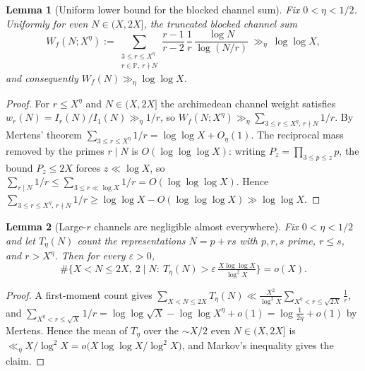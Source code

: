 \documentclass[]{interact}%
\newtheorem{lemma}{Lemma}
\newcommand{\PP}{\mathbb P}
\begin{document}
\begin{lemma}[Uniform lower bound for the blocked channel sum]\label{lem:Wf-size}
Fix $0<\eta<1/2$. Uniformly for even $N\in(X,2X]$, the truncated blocked channel sum
\[
  W_f(N;X^\eta):=\sum_{\substack{3\le r\le X^\eta\\ r\in\PP,\ r\nmid N}}\frac{r-1}{r-2}\,\frac1r\,\frac{\log N}{\log(N/r)}
  \ \gg_\eta\ \log\log X,
\]
and consequently $W_f(N)\gg_\eta\log\log X$.
\end{lemma}
\begin{proof}
For $r\le X^\eta$ and $N\in(X,2X]$ the archimedean channel weight satisfies
$w_r(N)=I_r(N)/I_1(N)\gg_\eta1/r$, so
$W_f(N;X^\eta)\gg_\eta\sum_{3\le r\le X^\eta,\,r\nmid N}1/r$. By Mertens' theorem
$\sum_{3\le r\le X^\eta}1/r=\log\log X+O_\eta(1)$. The reciprocal mass removed by the primes
$r\mid N$ is $O(\log\log\log X)$: writing $P_z=\prod_{3\le p\le z}p$, the bound $P_z\le2X$
forces $z\ll\log X$, so $\sum_{r\mid N}1/r\le\sum_{3\le r\ll\log X}1/r=O(\log\log\log X)$. Hence
$\sum_{3\le r\le X^\eta,\,r\nmid N}1/r\ge\log\log X-O(\log\log\log X)\gg\log\log X$.
\end{proof}

\begin{lemma}[Large-$r$ channels are negligible almost everywhere]\label{lem:large-r}
Fix $0<\eta<1/2$ and let $T_\eta(N)$ count the representations $N=p+rs$ with $p,r,s$ prime,
$r\le s$, and $r>X^\eta$. Then for every $\varepsilon>0$,
\[
  \#\Big\{X<N\le2X,\ 2\mid N:\ T_\eta(N)>\varepsilon\,\tfrac{X\log\log X}{\log^2X}\Big\}=o(X).
\]
\end{lemma}
\begin{proof}
A first-moment count gives
$\sum_{X<N\le2X}T_\eta(N)\ll\frac{X^2}{\log^2X}\sum_{X^\eta<r\le\sqrt{2X}}\frac1r$, and
$\sum_{X^\eta<r\le\sqrt X}1/r=\log\log\sqrt X-\log\log X^\eta+o(1)=\log\frac1{2\eta}+o(1)$ by
Mertens. Hence the mean of $T_\eta$ over the $\sim X/2$ even $N\in(X,2X]$ is
$\ll_\eta X/\log^2X=o\big(X\log\log X/\log^2X\big)$, and Markov's inequality gives the claim.
\end{proof}
\end{document}

